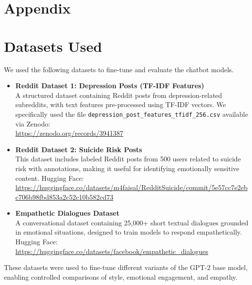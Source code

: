 \usepackage{csvsimple}
\usepackage{attachfile2}


\section{Appendix}

\appendix

\section{Datasets Used}
\label{appendix:datasets}
We used the following datasets to fine-tune and evaluate the chatbot models. 

\begin{itemize}
    \item \textbf{Reddit Dataset 1: Depression Posts (TF-IDF Features)} \\
    A structured dataset containing Reddit posts from depression-related subreddits, with text features pre-processed using TF-IDF vectors. We specifically used the file \texttt{depression\_post\_features\_tfidf\_256.csv} available via Zenodo: \\
    \url{https://zenodo.org/records/3941387}
    
    \item \textbf{Reddit Dataset 2: Suicide Risk Posts} \\
    This dataset includes labeled Reddit posts from 500 users related to suicide risk with annotations, making it useful for identifying emotionally sensitive content. Hugging Face: \\
    \url{https://huggingface.co/datasets/m4faisal/RedditSuicide/commit/5e57cc7e2ebc706b98fbd853a2c52c10b582cd73}
    
    \item \textbf{Empathetic Dialogues Dataset} \\
    A conversational dataset containing 25,000+ short textual dialogues grounded in emotional situations, designed to train models to respond empathetically. Hugging Face: \\
    \url{https://huggingface.co/datasets/facebook/empathetic_dialogues}
\end{itemize}

These datasets were used to fine-tune different variants of the GPT-2 base model, enabling controlled comparisons of style, emotional engagement, and empathy.

